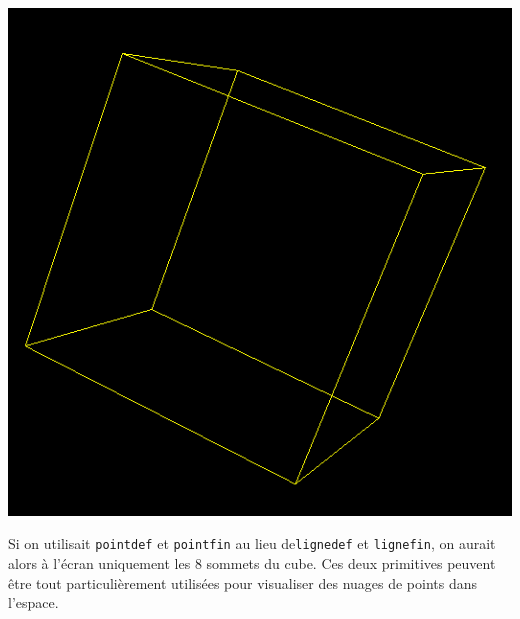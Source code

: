 \begin{center}
\includegraphics*[scale=0.4]{images/3dCube2.png}
\end{center}
Si on utilisait \texttt{pointdef} et \texttt{pointfin} au lieu de\texttt{lignedef} et \texttt{lignefin}, on aurait alors à l'écran uniquement les 8 sommets du cube. Ces deux primitives peuvent être tout particulièrement utilisées pour visualiser des nuages de points dans l'espace.
